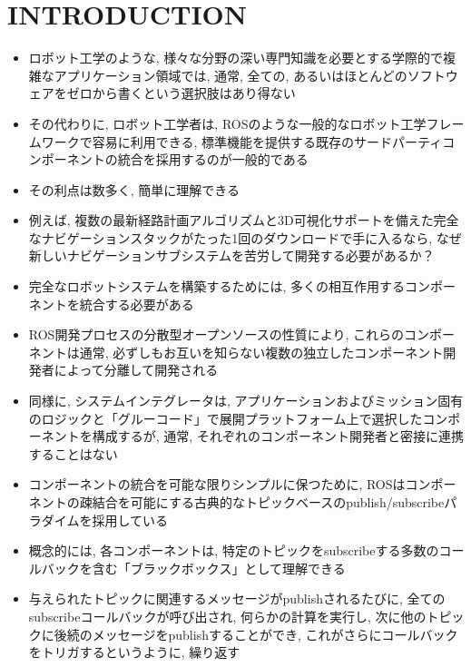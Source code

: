 
\section{INTRODUCTION}
\label{sec: introduction}

\begin{frame}{}
    \begin{itemize}
        \item ロボット工学のような, 様々な分野の深い専門知識を必要とする学際的で複雑なアプリケーション領域では, 通常, 全ての, あるいはほとんどのソフトウェアをゼロから書くという選択肢はあり得ない
        \item その代わりに, ロボット工学者は, ROSのような一般的なロボット工学フレームワークで容易に利用できる, 標準機能を提供する既存のサードパーティコンポーネントの統合を採用するのが一般的である
        \item その利点は数多く, 簡単に理解できる
        \item 例えば, 複数の最新経路計画アルゴリズムと3D可視化サポートを備えた完全なナビゲーションスタックがたった1回のダウンロードで手に入るなら, なぜ新しいナビゲーションサブシステムを苦労して開発する必要があるか？
    \end{itemize}
\end{frame}

\begin{frame}{}
    \begin{itemize}
        \item 完全なロボットシステムを構築するためには, 多くの相互作用するコンポーネントを統合する必要がある
        \item ROS開発プロセスの分散型オープンソースの性質により, これらのコンポーネントは通常, 必ずしもお互いを知らない複数の独立したコンポーネント開発者によって分離して開発される
        \item 同様に, システムインテグレータは, アプリケーションおよびミッション固有のロジックと「グルーコード」で展開プラットフォーム上で選択したコンポーネントを構成するが, 通常, それぞれのコンポーネント開発者と密接に連携することはない
    \end{itemize}
\end{frame}

\begin{frame}{}
    \begin{itemize}
        \item コンポーネントの統合を可能な限りシンプルに保つために, ROSはコンポーネントの疎結合を可能にする古典的なトピックベースのpublish/subscribeパラダイムを採用している
        \item 概念的には, 各コンポーネントは, 特定のトピックをsubscribeする多数のコールバックを含む「ブラックボックス」として理解できる
        \item 与えられたトピックに関連するメッセージがpublishされるたびに, 全てのsubscribeコールバックが呼び出され, 何らかの計算を実行し, 次に他のトピックに後続のメッセージをpublishすることができ, これがさらにコールバックをトリガするというように, 繰り返す
    \end{itemize}
\end{frame}

